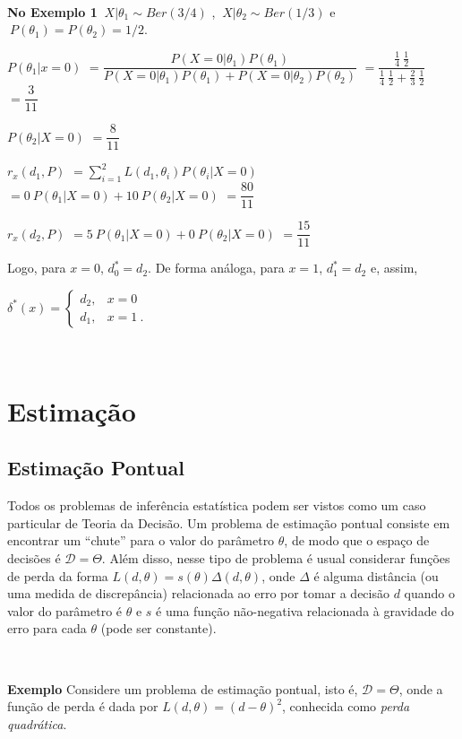 \documentclass[
]{book}
\begin{document}
\(~\)

\textbf{No Exemplo 1} \(~X|\theta_1 \sim Ber(3/4)\) , \(~X|\theta_2 \sim Ber(1/3)\) e \(~P(\theta_1)=P(\theta_2)=1/2\).

\(P(\theta_1|x=0)\) \(=\dfrac{P(X=0|\theta_1)P(\theta_1)}{P(X=0|\theta_1)P(\theta_1)+P(X=0|\theta_2)P(\theta_2)}\) \(=\dfrac{\frac{1}{4}~\frac{1}{2}}{\frac{1}{4}~\frac{1}{2}+\frac{2}{3}~\frac{1}{2}}\) \(=\dfrac{3}{11}\)

\(P(\theta_2|X=0)\) \(=\dfrac{8}{11}\)

\(r_x(d_1,P)\) \(=\displaystyle \sum_{i=1}^2L(d_1,\theta_i)P(\theta_i|X=0)\) \(=0~P(\theta_1|X=0)+10~P(\theta_2|X=0)\) \(=\dfrac{80}{11}\)

\(r_x(d_2,P)\) \(=5~P(\theta_1|X=0)+0~P(\theta_2|X=0)\) \(=\dfrac{15}{11}\)

Logo, para \(x=0\), \({d}_0^*={d}_2\). De forma análoga, para \(x=1\), \({d}_1^*={d}_2\) e, assim,

\({\delta}^*(x)=\left\{\begin{array}{rl} {d}_2, & x=0\\ {d}_1, & x=1~.\end{array}\right.\)

\(~\)

\hypertarget{Estimacao}{%
\chapter{Estimação}\label{Estimacao}}

\hypertarget{estimauxe7uxe3o-pontual}{%
\section{Estimação Pontual}\label{estimauxe7uxe3o-pontual}}

Todos os problemas de inferência estatística podem ser vistos como um caso particular de Teoria da Decisão. Um problema de estimação pontual consiste em encontrar um ``chute'' para o valor do parâmetro \(\theta\), de modo que o espaço de decisões é \(\mathcal{D}=\Theta\). Além disso, nesse tipo de problema é usual considerar funções de perda da forma \(L(d,\theta)=s(\theta)\Delta(d,\theta)\), onde \(\Delta\) é alguma distância (ou uma medida de discrepância) relacionada ao erro por tomar a decisão \(d\) quando o valor do parâmetro é \(\theta\) e \(s\) é uma função não-negativa relacionada à gravidade do erro para cada \(\theta\) (pode ser constante).

\(~\)

\textbf{Exemplo} Considere um problema de estimação pontual, isto é, \(\mathcal{D}=\Theta\), onde a função de perda é dada por \(L(d,\theta)=(d-\theta)^2\), conhecida como \emph{perda quadrática}.
\end{document}
